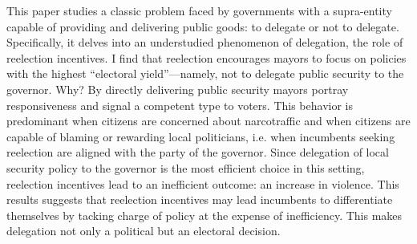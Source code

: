 \documentclass[12pt]{amsart}
\numberwithin{equation}{section}
\theoremstyle{definition}
\theoremstyle{definition}
\theoremstyle{definition}
\begin{document}
This paper studies a classic problem faced by governments with a supra-entity capable of providing and delivering public goods: to delegate or not to delegate. Specifically, it delves into an understudied phenomenon of delegation, the role of reelection incentives. I find that reelection encourages mayors to focus on policies with the highest “electoral yield”—namely, not to delegate public security to the governor. Why? By directly delivering public security mayors portray responsiveness and signal a competent type to voters. This behavior is predominant when citizens are concerned about narcotraffic and when citizens are capable of blaming or rewarding local politicians, i.e. when incumbents seeking reelection are aligned with the party of the governor. Since delegation of local security policy to the governor is the most efficient choice in this setting, reelection incentives lead to an inefficient outcome: an increase in violence. This results suggests that reelection incentives may lead incumbents to differentiate themselves by tacking charge of policy at the expense of inefficiency. This makes delegation not only a political but an electoral decision. 
  
    
            
\clearpage
   
 
      
\end{document}
